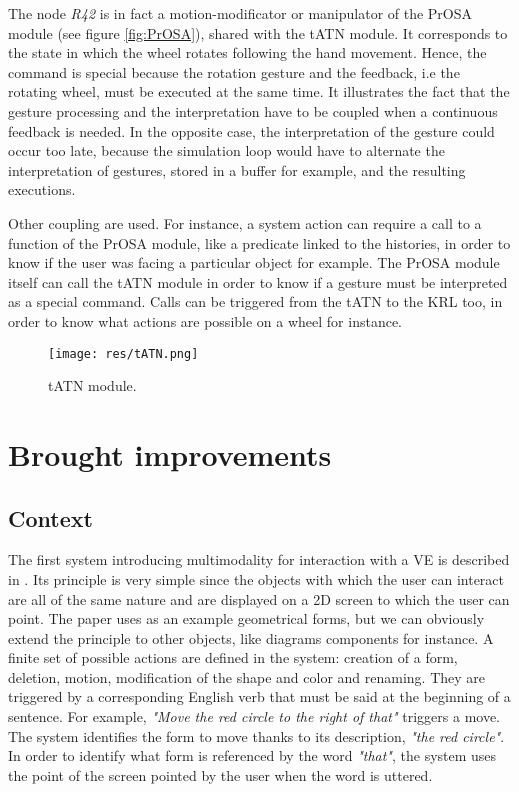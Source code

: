 \documentclass[a4paper]{article}
\begin{document}
The node \textit{R42} is in fact a motion-modificator or manipulator of the PrOSA module (see figure \ref{fig:PrOSA}), shared with the tATN module. It corresponds to the state in which the wheel rotates following the hand movement. Hence, the command is special because the rotation gesture and the feedback, i.e the rotating wheel, must be executed at the same time. It illustrates the fact that the gesture processing and the interpretation have to be coupled when a continuous feedback is needed. In the opposite case, the interpretation of the gesture could occur too late, because the simulation loop would have to alternate the interpretation of gestures, stored in a buffer for example, and the resulting executions.

Other coupling are used. For instance, a system action can require a call to a function of the PrOSA module, like a predicate linked to the histories, in order to know if the user was facing a particular object for example. The PrOSA module itself can call the tATN module in order to know if a gesture must be interpreted as a special command. Calls can be triggered from the tATN to the KRL too, in order to know what actions are possible on a wheel for instance.

\begin{figure}
\centering
\texttt{[image: res/tATN.png]}
\caption{\label{fig:tATN}tATN module.}
\end{figure}

\section{Brought improvements}

\subsection{Context}
The first system introducing multimodality for interaction with a VE is described in \cite{putthatthere}. Its principle is very simple since the objects with which the user can interact are all of the same nature and are displayed on a 2D screen to which the user can point. The paper uses as an example geometrical forms, but we can obviously extend the principle to other objects, like diagrams components for instance. A finite set of possible actions are defined in the system: creation of a form, deletion, motion, modification of the shape and color and renaming. They are triggered by a corresponding English verb that must be said at the beginning of a sentence. For example, \textit{"Move the red circle to the right of that"} triggers a move. The system identifies the form to move thanks to its description, \textit{"the red circle"}. In order to identify what form is referenced by the word \textit{"that"}, the system uses the point of the screen pointed by the user when the word is uttered.
\end{document}
